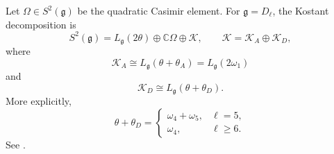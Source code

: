 \documentclass[11pt,reqno]{amsart}
\theoremstyle{definition}
\theoremstyle{remark}
\begin{document}
Let \(\Omega\in S^2(\mathfrak g)\) be the quadratic Casimir element.
For \(\mathfrak g=D_\ell\), the Kostant decomposition is
\begin{equation*}
  S^2(\mathfrak g)
  =
  L_{\mathfrak g}(2\theta)
  \oplus
  \mathbb C\Omega
  \oplus
  \mathcal K,
  \qquad
  \mathcal K=\mathcal K_A\oplus\mathcal K_D,
\end{equation*}
where
\begin{equation}
  \mathcal K_A
  \cong
  L_{\mathfrak g}(\theta+\theta_A)
  =
  L_{\mathfrak g}(2\omega_1)
  \label{dl:eq:Dl-first-Kostant-component}
\end{equation}
and
\begin{equation*}
  \mathcal K_D
  \cong
  L_{\mathfrak g}(\theta+\theta_D).
\end{equation*}
More explicitly,
\begin{equation}
  \theta+\theta_D
  =
  \begin{cases}
    \omega_4+\omega_5,&\ell=5,\\
    \omega_4,&\ell\ge6.
  \end{cases}
  \label{dl:eq:Dl-second-Kostant-highest-weight-cases}
\end{equation}
See \cite[Section~2 and Theorem~4.2(4)]{ArakawaMoreau2018}.
\end{document}
